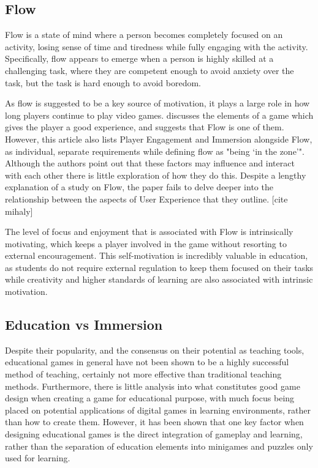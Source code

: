 \documentclass[journal]{IEEEtran}
\begin{document}
\subsection{Flow}
Flow is a state of mind where a person becomes completely focused on an activity, losing sense of time and tiredness while fully engaging with the activity. Specifically, flow appears to emerge when a person is highly skilled at a challenging task, where they are competent enough to avoid anxiety over the task, but the task is hard enough to avoid boredom. \cite{flowHandbook}


As flow is suggested to be a key source of motivation, \cite{flowHandbook} it plays a large role in how long players continue to play video games. \cite{MaximiseEffectivness} discusses the elements of a game which gives the player a good experience, and suggests that Flow is one of them. However, this article also lists Player Engagement and Immersion alongside Flow, as individual, separate requirements while defining flow as "being `in the zone'". Although the authors point out that these factors may influence and interact with each other there is little exploration of how they do this. Despite a lengthy explanation of a study on Flow, the paper fails to delve deeper into the relationship between the aspects of User Experience that they outline. [cite mihaly] %

The level of focus and enjoyment that is associated with Flow is intrinsically motivating, which keeps a player involved in the game without resorting to external encouragement. \cite{flowHandbook} This self-motivation is incredibly valuable in education, as students do not require external regulation to keep them focused on their tasks while creativity and higher standards of learning are also associated with intrinsic motivation. \cite{flowAndMotivation}

\subsection{Education vs Immersion}

Despite their popularity, and the consensus on their potential as teaching tools, \cite{SomeExamplesOfThis} educational games in general have not been shown to be a highly successful method of teaching, certainly not more effective than traditional teaching methods. \cite{educationGamesEmpiricle} Furthermore, there is little analysis into what constitutes good game design when creating a game for educational purpose, with much focus being placed on potential applications of digital games in learning environments, rather than how to create them.\cite{SupporThisForLoveOfGod} However, it has been shown that one key factor when designing educational games is the direct integration of gameplay and learning, \cite{educationGamesEmpiricle} rather than the separation of education elements into minigames and puzzles only used for learning.
\end{document}
